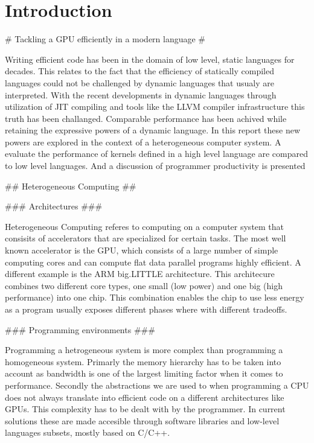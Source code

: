 
\chapter{Introduction}





\begin{markdown}
# Tackling a GPU efficiently in a modern language #

Writing efficient code has been in the domain of low level, static
languages for decades. This relates to the fact that the efficiency of
statically compiled languages could not be challenged by dynamic
languages that usualy are interpreted.  With the recent developments
in dynamic languages through utilization of \gls{JIT} compiling and
tools like the \gls{LLVM} \cite{llvm} compiler infrastructure this
truth has been challanged. Comparable performance has been achived
while retaining the expressive powers of a dynamic language. In this
report these new powers are explored in the context of a heterogeneous
computer system. A evaluate the performance of kernels defined in a
high level language are compared to low level languages. And a
discussion of programmer productivity is presented

## Heterogeneous Computing ##

### Architectures ###

Heterogeneous Computing referes to computing on a computer system that
consisits of accelerators that are specialized for certain tasks. The
most well known accelerator is the \gls{GPU}, which consists of a
large number of simple computing cores and can compute flat data
parallel programs highly efficient. A different example is the ARM
big.LITTLE \cite{big.LITTLE} architecture. This architecure combines
two different core types, one small (low power) and one big (high
performance) into one chip. This combination enables the chip to use
less energy as a program usually exposes different phases where with
different tradeoffs.

### Programming environments ###

Programming a hetrogeneous system is more complex than programming a
homogeneous system. Primarly the memory hierarchy has to be taken into
account as bandwidth is one of the largest limiting factor when it
comes to performance. Secondly the abstractions we are used to when
programming a \gls{CPU} does not always translate into efficient code
on a different architectures like \gls{GPU}s. This complexity has to
be dealt with by the programmer. In current solutions these are made
accesible through software libraries and low-level languages subsets,
mostly based on C/C++. 


\end{markdown}
